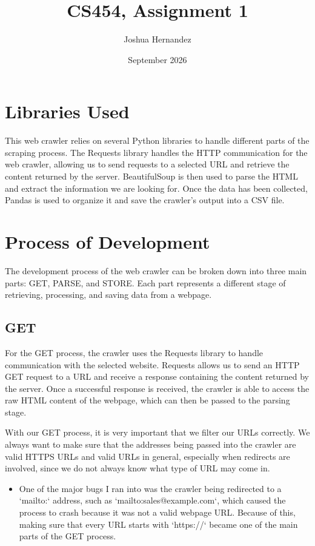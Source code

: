 \documentclass{article}
\title{CS454, Assignment 1}
\author{Joshua Hernandez}
\date{September 2026}
\begin{document}
\maketitle

\section{Libraries Used}
This web crawler relies on several Python libraries to handle different parts of the scraping process. The Requests library handles the HTTP communication for the web crawler, allowing us to send requests to a selected URL and retrieve the content returned by the server. BeautifulSoup is then used to parse the HTML and extract the information we are looking for. Once the data has been collected, Pandas is used to organize it and save the crawler's output into a CSV file.

\section{Process of Development}
The development process of the web crawler can be broken down into three main parts: GET, PARSE, and STORE. Each part represents a different stage of retrieving, processing, and saving data from a webpage.
\subsection{GET}
For the GET process, the crawler uses the Requests library to handle communication with the selected website. Requests allows us to send an HTTP GET request to a URL and receive a response containing the content returned by the server. Once a successful response is received, the crawler is able to access the raw HTML content of the webpage, which can then be passed to the parsing stage.

\vspace{0.5em}

With our GET process, it is very important that we filter our URLs correctly. We always want to make sure that the addresses being passed into the crawler are valid HTTPS URLs and valid URLs in general, especially when redirects are involved, since we do not always know what type of URL may come in.

\vspace{0.5em}

\begin{itemize}
    \item One of the major bugs I ran into was the crawler being redirected to a `mailto:` address, such as `mailto:sales@example.com`, which caused the process to crash because it was not a valid webpage URL. Because of this, making sure that every URL starts with `https://` became one of the main parts of the GET process.
\end{itemize}
\end{document}
